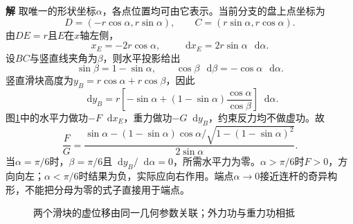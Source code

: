 \documentclass[11pt,openany,fontset=fandol]{ctexbook}
\theoremstyle{definition}\newtheorem{example}{例}[chapter]\newtheorem{exercise}{习题}[chapter]
\newcommand{\SolutionStart}{\par\medskip\ifdim\pagetotal>0pt\ifdim\dimexpr\pagegoal-\pagetotal\relax<3\baselineskip\newpage\fi\fi\noindent\textbf{解}\quad\ignorespaces}
\newenvironment{solution}{\SolutionStart}{\par\medskip}
\newcommand{\dd}{\mathop{}\!\mathrm d}\newcommand{\ee}{\mathrm e}\newcommand{\vct}[1]{\bm{#1}}
\begin{document}
\begin{solution}
取唯一的形状坐标$\alpha$，各点位置均可由它表示。当前分支的盘上点坐标为
\[
 D=(-r\cos\alpha,r\sin\alpha),\qquad
 C=(r\sin\alpha,r\cos\alpha).
\]
由$DE=r$且$E$在$x$轴左侧，
\[
 x_E=-2r\cos\alpha,\qquad\dd x_E=2r\sin\alpha\,\dd\alpha.
\]
设$BC$与竖直线夹角为$\beta$，则水平投影给出
\[
 \sin\beta=1-\sin\alpha,\qquad
 \cos\beta\,\dd\beta=-\cos\alpha\,\dd\alpha.
\]
竖直滑块高度为$y_B=r\cos\alpha+r\cos\beta$，因此
\[
 \dd y_B=r\left[-\sin\alpha
            +(1-\sin\alpha)\frac{\cos\alpha}{\cos\beta}\right]\dd\alpha.
\]
图\ref{mp5:fig:hw:l5-37-s}中的水平力做功$-F\dd x_E$，重力做功$-G\dd y_B$，约束反力均不做虚功。故
\[
 \boxed{\frac FG=\frac{\sin\alpha-
 (1-\sin\alpha)\cos\alpha/\sqrt{1-(1-\sin\alpha)^2}}
 {2\sin\alpha}}.
\]
当$\alpha=\pi/6$时，$\beta=\pi/6$且$\dd y_B/\dd\alpha=0$，所需水平力为零。$\alpha>\pi/6$时$F>0$，方向向左；$\alpha<\pi/6$时结果为负，实际应向右作用。端点$\alpha\to0$接近连杆的奇异构形，不能把分母为零的式子直接用于端点。


\begin{figure}[H]\centering
{}
\caption{两个滑块的虚位移由同一几何参数关联；外力功与重力功相抵}\label{mp5:fig:hw:l5-37-s}
\end{figure}

\end{solution}
\end{document}

